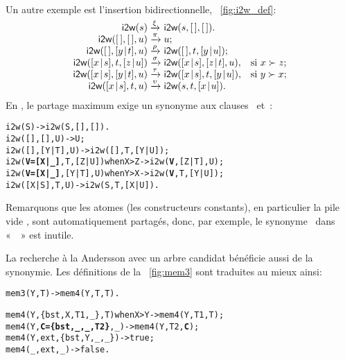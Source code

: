 \noindent Un autre exemple est l'insertion bidirectionnelle,
\fig~\vref{fig:i2w_def}:
\begin{equation*}
\begin{array}{@{}r@{\;}l@{\;}ll@{}}
\fun{i2w}(s)         & \xrightarrow{\smash{\xi}}
                     & \fun{i2w}(s,\el,\el).\\
\fun{i2w}(\el,\el,u) & \xrightarrow{\smash{\pi}}
                     & u;\\
\fun{i2w}(\el,\cons{y}{t},u)
                     & \xrightarrow{\smash{\rho}}
                     & \fun{i2w}(\el,t,\cons{y}{u});\\
\fun{i2w}(\cons{x}{s},t,\cons{z}{u})
                     & \xrightarrow{\smash{\sigma}}
                     & \fun{i2w}(\cons{x}{s},\cons{z}{t},u),
                     & \text{si \(x \succ z\)};\\
\fun{i2w}(\cons{x}{s},\cons{y}{t},u)
                     & \xrightarrow{\smash{\tau}}
                     & \fun{i2w}(\cons{x}{s},t,\cons{y}{u}),
                     & \text{si \(y \succ x\)};\\
\fun{i2w}(\cons{x}{s},t,u)
                     & \xrightarrow{\smash{\upsilon}}
                     & \fun{i2w}(s,t,\cons{x}{u}).
\end{array}
\end{equation*}
En \Erlang, le partage maximum exige un synonyme aux clauses
\clause{\sigma}~et~\clause{\tau}:
\begin{alltt}
i2w(S)                              -> i2w(S,[],[]).
i2w(     [],   [],    U)            -> U;
i2w(     [],[Y|T],    U)            -> i2w([],T,[Y|U]);
i2w(\textbf{V=[X|\_]},    T,[Z|U]) when X > Z -> i2w(\textbf{V},[Z|T],U);
i2w(\textbf{V=[X|\_]},[Y|T],    U) when Y > X -> i2w(\textbf{V},T,[Y|U]);
i2w(  [X|S],    T,    U)            -> i2w(S,T,[X|U]).
\end{alltt}
Remarquons que les atomes (les constructeurs constants), en
particulier la pile vide \erlcode{[]}, sont automatiquement partagés,
donc, par exemple, le synonyme~ dans «~~» est inutile.

La recherche à la Andersson avec un arbre candidat bénéficie aussi de
la synonymie. Les définitions de la \fig~\vref{fig:mem3} sont
traduites au mieux ainsi:
\begin{alltt}
mem3(Y,T) -> mem4(Y,T,T).

mem4(Y,  \{bst,X,T1,_\},        T) when X > Y -> mem4(Y,T1,T);
mem4(Y,\textbf{C=\{bst,_,_,T2\}},        _)            -> mem4(Y,T2,\textbf{C});
mem4(Y,         ext,\{bst,Y,_,_\})            -> true;
mem4(_,           ext,        _)            -> false.
\end{alltt}

